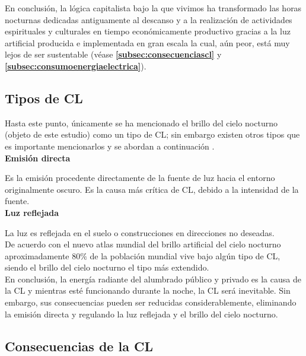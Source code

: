 En conclusión, la lógica capitalista bajo la que vivimos ha transformado las horas nocturnas dedicadas antiguamente al descanso y a la realización de actividades espirituales y culturales en tiempo económicamente productivo gracias a la luz artificial producida e implementada en gran escala la cual, aún peor, está muy lejos de ser sustentable (véase \textbf{\autoref{subsec:consecuenciascl}} y \textbf{\autoref{subsec:consumoenergiaelectrica}}).

\newpage

\subsection{Tipos de CL} 

Hasta este punto, únicamente se ha mencionado el brillo del cielo nocturno (objeto de este estudio) como un tipo de CL; sin embargo existen otros tipos que es importante mencionarlos y se abordan a continuación \citep{LibroCL}.\\ 

\textbf{Emisión directa}

Es la emisión procedente directamente de la fuente de luz hacia el entorno originalmente oscuro. Es la causa más crítica de CL, debido a la intensidad de la fuente.\\ 

\textbf{Luz reflejada}

La luz es reflejada en el suelo o construcciones en direcciones no deseadas.\\ 


De acuerdo con el nuevo atlas mundial del brillo artificial del cielo nocturno \citep{Falchi2016} aproximadamente 80$\%$ de la población mundial vive bajo algún tipo de CL, siendo el brillo del cielo nocturno el tipo más extendido.\\ 

En conclusión, la energía radiante del alumbrado público y privado es la causa de la CL y mientras esté funcionando durante la noche, la CL será inevitable. Sin embargo, sus consecuencias pueden ser reducidas considerablemente, eliminando la emisión directa y regulando la luz reflejada y el brillo del cielo nocturno.\\ 

\subsection{Consecuencias de la CL}
\label{subsec:consecuenciascl}

